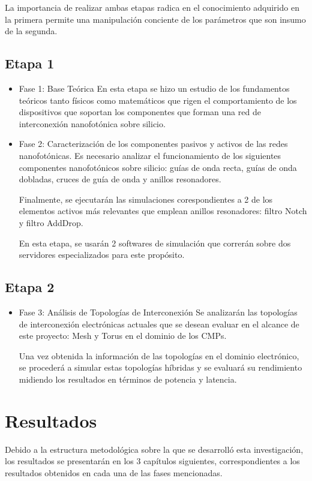La importancia de realizar ambas etapas radica en el conocimiento adquirido en la primera
 permite una manipulación conciente de los parámetros que son insumo de la segunda. 


\subsection{Etapa 1}
\begin{itemize}
\item Fase 1: Base Teórica
En esta etapa se hizo un estudio de los fundamentos teóricos tanto físicos
como matemáticos que rigen el comportamiento de los dispositivos que soportan
los componentes que forman una red de interconexión nanofotónica sobre silicio. 

\item Fase 2: Caracterización de los componentes pasivos y activos de las redes nanofotónicas. 
Es necesario analizar el funcionamiento de los siguientes componentes 
nanofotónicos sobre silicio: guías de onda recta, guías de onda dobladas, cruces de guía de onda 
y anillos resonadores.

Finalmente, se ejecutarán las simulaciones corespondientes a 
2 de los elementos activos más relevantes que
emplean anillos resonadores: filtro Notch y filtro AddDrop.

En esta etapa, se usarán 2 softwares de simulación que correrán 
sobre dos servidores especializados para este propósito. 
\end{itemize} 

\subsection{Etapa 2} 
\begin{itemize}
\item Fase 3: Análisis de Topologías de Interconexión
Se analizarán las topologías de interconexión electrónicas 
actuales que se desean evaluar en el alcance de este proyecto: Mesh y Torus 
en el dominio de los CMPs.

Una vez obtenida la información de las topologías en el dominio electrónico, 
se procederá a simular estas topologías híbridas y se evaluará su rendimiento
midiendo los resultados en términos de potencia y latencia.

\end{itemize} 

\section{Resultados}

Debido a la estructura metodológica sobre la que se desarrolló esta investigación,
los resultados se presentarán en los 3 capítulos siguientes, correspondientes a 
los resultados obtenidos en cada una de las fases mencionadas.
